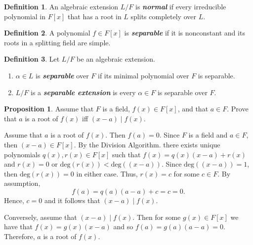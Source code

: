 \documentclass[leqno]{article}
\makeatletter
\theoremstyle{definition}
\newtheorem{prop}{Proposition}
\newtheorem{definition}{Definition}
\theoremstyle{remark}
\let\oldproofname=\proofname
\renewcommand{\proofname}{\textit{\oldproofname}}
\theoremstyle{definition}
\renewenvironment{proof}[1][\proofname]{\par
  \pushQED{\qed}%
  \normalfont \topsep6\p@\@plus6\p@\relax
  \list{}{\leftmargin=0mm
          \rightmargin=0mm
          \settowidth{\itemindent}{\itshape#1}%
          \labelwidth=\itemindent
          \parsep=0pt \listparindent=0mm%
  }
  \item[\hskip\labelsep
        \itshape
    #1\@addpunct{.}]\ignorespaces
}{%
  \popQED\endlist\@endpefalse
}
\makeatother
\begin{document}
        \begin{proof}
            
        \end{proof}
    \begin{definition}
        An algebraic extension $L/F$ is \textbf{\textit{normal}} if every irreducible polynomial in $F[x]$ that has a root in $L$ splits completely over $L$.
    \end{definition}
    \begin{definition}
        A polynomial $f\in F[x]$ is \textbf{\textit{separable}} if it is nonconstant and its roots in a splitting field are simple.
    \end{definition}
    \begin{definition}
        Let $L/F$ be an algebraic extension.
            \begin{enumerate}
                \item $\alpha\in L$ is \textbf{\textit{separable}} over $F$ if its minimal polynomial over $F$ is separable.
                \item $L/F$ is a \textbf{\textit{separable extension}} is every $\alpha\in F$ is separable over $F$.
            \end{enumerate}
    \end{definition}
    \begin{prop}\label{prop:1.1}
        Assume that $F$ is a field, $f(x)\in F[x]$, and that $a\in F$. Prove that $a$ is a root of $f(x)$ iff $(x-a)\mid f(x)$.
    \end{prop}
        \begin{proof}
            Assume that $a$ is a root of $f(x)$. Then $f(a)=0$. Since $F$ is a field and $a\in F$, then $(x-a)\in F[x]$. By the Division Algorithm. there exists unique polynomials $q(x),r(x)\in F[x]$ such that $f(x)=q(x)(x-a)+r(x)$ and $r(x)=0$ or $\text{deg}(r(x))<\text{deg}((x-a))$. Since $\text{deg}((x-a))=1$, then $\text{deg}(r(x))=0$ in either case. Thus, $r(x)=c$ for some $c\in F$. By assumption, 
                \begin{equation*}
                    f(a)=q(a)(a-a)+c=c=0.
                \end{equation*}
            Hence, $c=0$ and it follows that $(x-a)\mid f(x)$.\par\hspace{4mm} Conversely, assume that $(x-a)\mid f(x)$. Then for some $g(x)\in F[x]$ we have that $f(x)=g(x)(x-a)$ and so $f(a)=g(a)(a-a)=0$. Therefore, $a$ is a root of $f(x)$.
        \end{proof}
\end{document}
